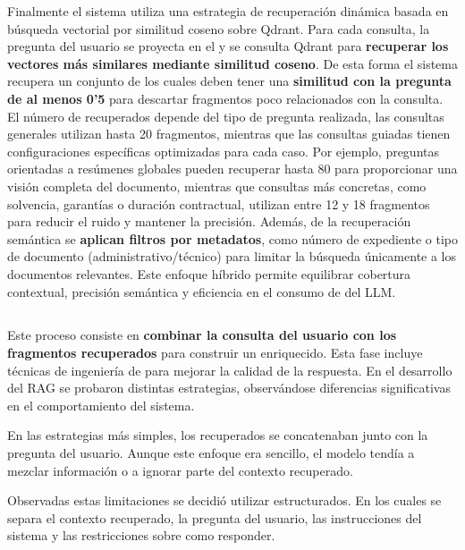 Finalmente el sistema utiliza una estrategia de recuperación dinámica basada en búsqueda vectorial por similitud coseno sobre Qdrant. Para cada consulta, la pregunta del usuario se proyecta en el  y se consulta Qdrant para \textbf{recuperar los vectores más similares mediante similitud coseno}. De esta forma el sistema recupera un conjunto de  los cuales deben tener una \textbf{similitud con la pregunta de al menos 0'5} para descartar fragmentos poco relacionados con la consulta. El número de  recuperados depende del tipo de pregunta realizada, las consultas generales utilizan hasta 20 fragmentos, mientras que las consultas guiadas tienen configuraciones específicas optimizadas para cada caso. Por ejemplo, preguntas orientadas a resúmenes globales pueden recuperar hasta 80  para proporcionar una visión completa del documento, mientras que consultas más concretas, como solvencia, garantías o duración contractual, utilizan entre 12 y 18 fragmentos para reducir el ruido y mantener la precisión. Además, de la recuperación semántica se \textbf{aplican filtros por metadatos}, como número de expediente o tipo de documento (administrativo/técnico) para limitar la búsqueda únicamente a los documentos relevantes. Este enfoque híbrido permite equilibrar cobertura contextual, precisión semántica y eficiencia en el consumo de  del LLM.

\subsection{}

Este proceso consiste en \textbf{combinar la consulta del usuario con los fragmentos recuperados} para construir un  enriquecido. Esta fase incluye técnicas de ingeniería de  para mejorar la calidad de la respuesta. En el desarrollo del RAG se probaron distintas estrategias, observándose diferencias significativas en el comportamiento del sistema. 

En las estrategias más simples, los  recuperados se concatenaban junto con la pregunta del usuario. Aunque este enfoque era sencillo, el modelo tendía a mezclar información o a ignorar parte del contexto recuperado. 

Observadas estas limitaciones se decidió utilizar  estructurados. En los cuales se separa el contexto recuperado, la pregunta del usuario, las instrucciones del sistema y las restricciones sobre como responder. 

